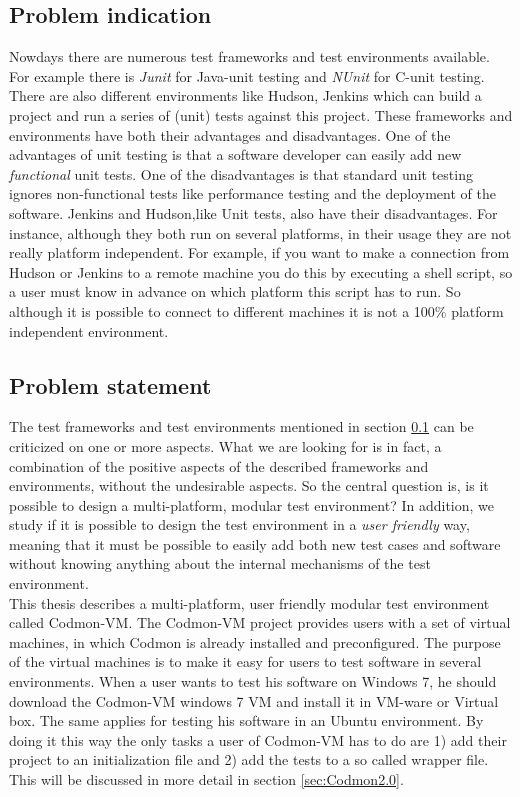 \documentclass{article}
\newcommand{\project}{Codmon-VM}
\newcommand{\CS}{C\nolinebreak\hspace{-.05em}\raisebox{.6ex}{\bf \#}}
\begin{document}
\subsection{Problem indication}
\label{subsec:Problemindication}
Nowdays there are numerous test frameworks and test environments available. For example there is \emph{Junit}\cite{Junit} for Java-unit testing and \emph{NUnit}\cite{Nunit} for \CS{}-unit testing.
There are also different environments like Hudson\cite{HudsonDoc}\cite{Hudson}, Jenkins\cite{JenkinsDoc} which can build a project and run a series of (unit) tests against this project. 
These frameworks and environments have both their advantages and disadvantages. One of the advantages of unit testing is that a software developer can easily add new \emph{functional} unit tests.
One of the disadvantages is that standard unit testing ignores non-functional tests like performance testing and the deployment of the software. Jenkins and Hudson,like Unit tests, also have their
disadvantages. For instance, although they both run on several platforms, in their usage they are not really platform independent. For example, if you want
to make a connection from Hudson or Jenkins to a remote machine you do this by executing a shell script, so a user must know in advance on which platform this script has to run.
So although it is possible to connect to different machines it is not a 100\% platform independent environment.
 
\subsection{Problem statement}
\label{subsec:Problemstatement}
The test frameworks and test environments mentioned in section \ref{subsec:Problemindication} can be criticized on one or more aspects. What we are looking for is in fact, a combination
of the positive aspects of the described frameworks and environments, without the undesirable aspects. So the central question is, is it possible to design a
multi-platform, modular test environment? In addition, we study if it is possible to design the test environment in a \emph{user friendly} way, meaning that it must
be possible to easily add both new test cases and software without knowing anything about the internal mechanisms of the test environment.\\

\noindent This thesis describes a multi-platform, user friendly modular test environment called \project{}. The \project{} project provides users with a set of virtual machines,
in which Codmon is already installed and preconfigured. The purpose of the virtual machines is to make it easy for users to test software in several environments.  When a user wants to 
test his software on Windows 7, he should download the \project{} windows 7 VM and install it in VM-ware or Virtual box. The same applies for testing his software in an Ubuntu environment. 
By doing it this way the  only tasks a user of \project{} has to do are 1) add their project to an initialization file and 2) add the tests to a so called wrapper file. This will be discussed 
in more detail in section \ref{sec:Codmon2.0}.
\end{document}
